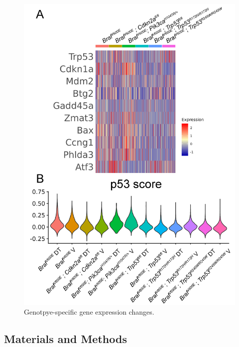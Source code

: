 \begin{figure}
\hypertarget{fig:04}{%
\centering
\includegraphics[width=1\textwidth,height=\textheight]{images/scrna_6.png}
\caption{Genotpye-specific gene expression changes.}\label{fig:04}
}
\end{figure}

\hypertarget{materials-and-methods}{%
\subsection{Materials and Methods}\label{materials-and-methods}}

